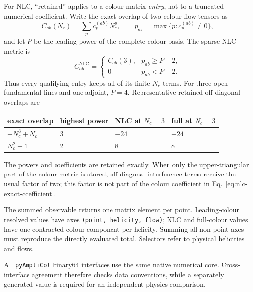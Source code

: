 \documentclass[10pt,letterpaper]{article}
\newcommand{\PAC}{\texttt{pyAmpliCol}}
\begin{document}
For NLC, ``retained'' applies to a colour-matrix \emph{entry}, not to a
truncated numerical coefficient.  Write the exact overlap of two colour-flow
tensors as
\begin{equation}
  C_{ab}(N_c)=\sum_p c^{(ab)}_p N_c^p,
  \qquad
  p_{ab}=\max\{p:c^{(ab)}_p\ne0\},
  \label{eq:nlc-entry-gate}
\end{equation}
and let \(P\) be the leading power of the complete colour basis.  The sparse
NLC metric is
\begin{equation}
  C^{\mathrm{NLC}}_{ab}=
  \begin{cases}
    C_{ab}(3), & p_{ab}\ge P-2,\\
    0,         & p_{ab}<P-2.
  \end{cases}
  \label{eq:nlc-exact-coefficient}
\end{equation}
Thus every qualifying entry keeps all of its finite-\(N_c\) terms.  For three
open fundamental lines and one adjoint, \(P=4\).  Representative retained
off-diagonal overlaps are

\begin{center}
\begin{tabular}{@{}L{1.45in}L{1.20in}L{1.35in}L{1.35in}@{}}
\toprule
\textbf{exact overlap} & \textbf{highest power} &
  \textbf{NLC at \(N_c=3\)} & \textbf{full at \(N_c=3\)} \\
\midrule
\(-N_c^3+N_c\) & \(3\) & \(-24\) & \(-24\) \\
\(N_c^2-1\) & \(2\) & \(8\) & \(8\) \\
\bottomrule
\end{tabular}
\end{center}

The powers and coefficients are retained exactly.  When only the
upper-triangular part of the colour metric is stored, off-diagonal interference
terms receive the usual factor of two; this factor is not part of the colour
coefficient in Eq.~\eqref{eq:nlc-exact-coefficient}.

The summed observable returns one matrix element per point.  Leading-colour
resolved values have axes \texttt{(point, helicity, flow)}; NLC and full-colour
values have one contracted colour component per helicity. Summing all
non-point axes must reproduce the directly evaluated total. Selectors refer to
physical helicities and flows.

All \PAC{} binary64 interfaces use the same native numerical core.
Cross-interface agreement therefore checks data conventions, while a
separately generated value is required for an independent physics comparison.
\end{document}
